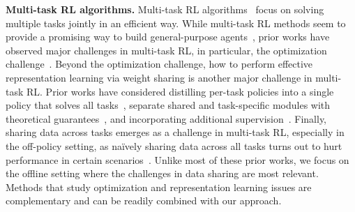 \textbf{Multi-task RL algorithms.} Multi-task RL algorithms~\citep{wilson2007multi,parisotto2015actor,teh2017distral,espeholt2018impala,hessel2019popart,yu2020gradient, xu2020knowledge, yang2020multi, kalashnikov2021mt,sodhani2021multi}
focus on solving multiple tasks jointly in an efficient way. While multi-task RL methods seem to provide a promising way to build general-purpose agents~\citep{kalashnikov2021mt}, prior works have observed major challenges in multi-task RL, in particular, the optimization challenge~\citep{hessel2019popart,schaul2019ray,yu2020gradient}.
Beyond the optimization challenge, how to perform effective representation learning via weight sharing is another major challenge in multi-task RL. Prior works have considered distilling per-task policies into a single policy that solves all tasks~\citep{rusu2015policy,teh2017distral,ghosh2017divide,xu2020knowledge}, separate shared and task-specific modules with theoretical guarantees~\citep{d2019sharing}, and incorporating additional supervision~\citep{sodhani2021multi}. Finally, sharing data across tasks emerges as a challenge in multi-task RL, especially in the off-policy setting, as na\"{i}vely sharing data across all tasks turns out to hurt performance in certain scenarios~\citep{kalashnikov2021mt}. Unlike most of these prior works, we focus on the offline setting where the challenges in data sharing are most relevant. Methods that study optimization and representation learning issues are complementary and can be readily combined with our approach.

